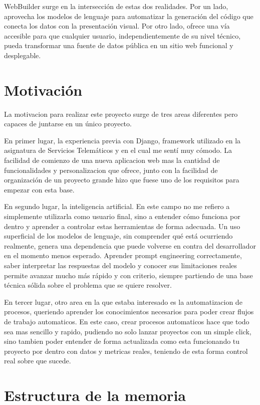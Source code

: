 WebBuilder surge en la intersección de estas dos realidades. Por un lado, aprovecha los modelos de lenguaje para automatizar la generación del código que conecta los datos con la presentación visual. Por otro lado, ofrece una vía accesible para que cualquier usuario, independientemente de su nivel técnico, pueda transformar una fuente de datos pública en un sitio web funcional y desplegable. 


\section{Motivación}
\label{sec:motivacion}

La motivacion para realizar este proyecto surge de tres areas diferentes pero capaces de juntarse en un único proyecto.

En primer lugar, la experiencia previa con Django, framework utilizado en la asignatura de Servicios Telemáticos y en el cual me sentí muy cómodo. La facilidad de comienzo de una nueva aplicacion web mas la cantidad de funcionalidades y personalizacion que ofrece, junto con la facilidad de organización de un proyecto grande hizo que fuese uno de los requisitos para empezar con esta base.

En segundo lugar, la inteligencia artificial. En este campo no me refiero a simplemente utilizarla como usuario final, sino a entender cómo funciona por dentro y aprender a controlar estas herramientas de forma adecuada. Un uso superficial de los modelos de lenguaje, sin comprender qué está ocurriendo realmente, genera una dependencia que puede volverse en contra del desarrollador en el momento menos esperado. Aprender prompt engineering correctamente, saber interpretar las respuestas del modelo y conocer sus limitaciones reales permite avanzar mucho más rápido y con criterio, siempre partiendo de una base técnica sólida sobre el problema que se quiere resolver.

En tercer lugar, otro area en la que estaba interesado es la automatizacion de procesos, queriendo aprender los conocimientos necesarios para poder crear flujos de trabajo automaticos. En este caso, crear procesos automaticos hace que todo sea mas sencillo y rapido, pudiendo no solo lanzar proyectos con un simple click, sino tambien poder entender de forma actualizada como esta funcionando tu proyecto por dentro con datos y metricas reales, teniendo de esta forma control real sobre que sucede.


\section{Estructura de la memoria}
\label{sec:estructura}

